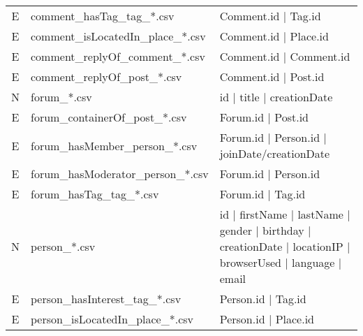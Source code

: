 \begin{table}[htb]
\begin{tabular}{|c|l|l|}
        E                    & comment\_hasTag\_tag\_*.csv             & Comment.id | Tag.id                                                                                        \\
        E                    & comment\_isLocatedIn\_place\_*.csv      & Comment.id | Place.id                                                                                      \\
        E                    & comment\_replyOf\_comment\_*.csv        & Comment.id | Comment.id                                                                                    \\
        E                    & comment\_replyOf\_post\_*.csv           & Comment.id | Post.id                                                                                       \\
        \hline
        N                    & forum\_*.csv                            & id | title | creationDate                                                                                  \\
        E                    & forum\_containerOf\_post\_*.csv         & Forum.id | Post.id                                                                                         \\
        E                    & forum\_hasMember\_person\_*.csv         & Forum.id | Person.id | joinDate/creationDate                                                               \\
        E                    & forum\_hasModerator\_person\_*.csv      & Forum.id | Person.id                                                                                       \\
        E                    & forum\_hasTag\_tag\_*.csv               & Forum.id | Tag.id                                                                                          \\
        \hline
        N                    & person\_*.csv                           & id | firstName | lastName | gender | birthday | creationDate | locationIP | browserUsed | language | email \\
        E                    & person\_hasInterest\_tag\_*.csv         & Person.id | Tag.id                                                                                         \\
        E                    & person\_isLocatedIn\_place\_*.csv       & Person.id | Place.id                                                                                       \\

\end{tabular}
\end{table}
